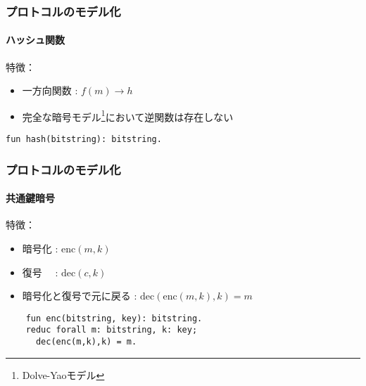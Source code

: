 \documentclass[dvipdfmx, dvipsnames, 11pt]{beamer}
\newcommand{\enc}{\mathrm{enc}}
\newcommand{\dec}{\mathrm{dec}}
\begin{document}
\begin{frame}[fragile]
  \frametitle{プロトコルのモデル化}
  \framesubtitle{ハッシュ関数}

  特徴：
  \begin{itemize}
    \item 一方向関数 : $f(m) \rightarrow h$
    \item 完全な暗号モデル\hspace{0em}\footnote{\tiny Dolve-Yaoモデル}\hspace{0em}において逆関数は存在しない
  \end{itemize}

  \begin{center}
  \end{center}
  \vspace{-1em}

  \begin{lstlisting}[basicstyle=\ttfamily\footnotesize]
    fun hash(bitstring): bitstring.
  \end{lstlisting}
\end{frame}

\begin{frame}[fragile]
  \frametitle{プロトコルのモデル化}
  \framesubtitle{共通鍵暗号}

  特徴：
  \begin{itemize}
    \item 暗号化 : $\enc(m, k)$
    \item 復号　 : $\dec(c, k)$
    \item 暗号化と復号で元に戻る : $\dec(\enc(m, k), k) = m$
  \end{itemize}

  \begin{center}
  \end{center}
  \vspace{-1em}

  \begin{lstlisting}
    fun enc(bitstring, key): bitstring.
    reduc forall m: bitstring, k: key;
      dec(enc(m,k),k) = m.
  \end{lstlisting}
\end{frame}
\end{document}
